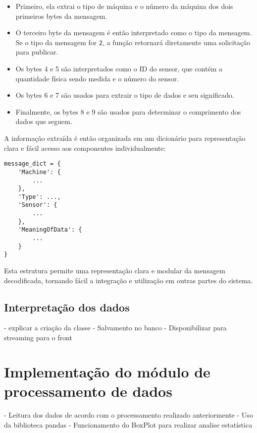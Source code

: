\begin{itemize}
    \item Primeiro, ela extrai o tipo de máquina e o número da máquina dos dois primeiros bytes da mensagem.
    
    \item O terceiro byte da mensagem é então interpretado como o tipo da mensagem. Se o tipo da mensagem for \texttt{2}, a função retornará diretamente uma solicitação para publicar.
    
    \item Os bytes 4 e 5 são interpretados como o ID do sensor, que contém a quantidade física sendo medida e o número do sensor.
    
    \item Os bytes 6 e 7 são usados para extrair o tipo de dados e seu significado.
    
    \item Finalmente, os bytes 8 e 9 são usados para determinar o comprimento dos dados que seguem.
\end{itemize}

A informação extraída é então organizada em um dicionário para representação clara e fácil acesso aos componentes individualmente:

\begin{verbatim}
message_dict = {
    'Machine': {
        ...
    },
    'Type': ...,
    'Sensor': {
        ...
    },
    'MeaningOfData': {
        ...
    }
}
\end{verbatim}

Esta estrutura permite uma representação clara e modular da mensagem decodificada, tornando fácil a integração e utilização em outras partes do sistema.

\subsection[Interpretação dos dados]{Interpretação dos dados}
- explicar a criação da classe
- Salvamento no banco
- Disponibilizar para streaming para o front 


\section[Implementação do módulo de processamento de dados]{Implementação do módulo de processamento de dados}
- Leitura dos dados de acordo com o processamento realizado anteriormente
- Uso da biblioteca pandas
- Funcionamento do BoxPlot para realizar analise estatística

